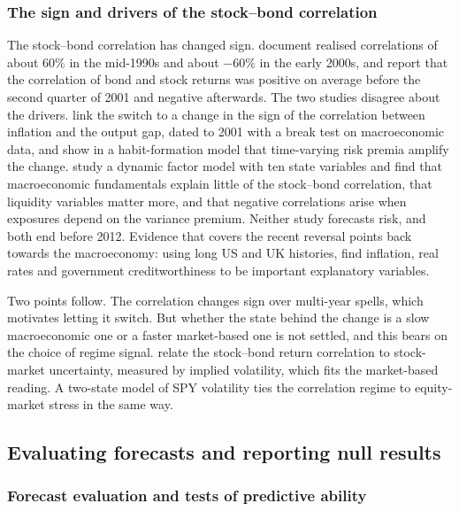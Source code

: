 \subsubsection{The sign and drivers of the stock--bond correlation}\label{sec:lit-drivers}

The stock--bond correlation has changed sign. \citet{baele2010} document realised correlations of about 60\% in the mid-1990s and about $-60\%$ in the early 2000s, and \citet{campbell2020} report that the correlation of bond and stock returns was positive on average before the second quarter of 2001 and negative afterwards. The two studies disagree about the drivers. \citet{campbell2020} link the switch to a change in the sign of the correlation between inflation and the output gap, dated to 2001 with a break test on macroeconomic data, and show in a habit-formation model that time-varying risk premia amplify the change. \citet{baele2010} study a dynamic factor model with ten state variables and find that macroeconomic fundamentals explain little of the stock--bond correlation, that liquidity variables matter more, and that negative correlations arise when exposures depend on the variance premium. Neither study forecasts risk, and both end before 2012. Evidence that covers the recent reversal points back towards the macroeconomy: using long US and UK histories, \citet{molenaar2024} find inflation, real rates and government creditworthiness to be important explanatory variables.

Two points follow. The correlation changes sign over multi-year spells, which motivates letting it switch. But whether the state behind the change is a slow macroeconomic one or a faster market-based one is not settled, and this bears on the choice of regime signal. \citet{connolly2005} relate the stock--bond return correlation to stock-market uncertainty, measured by implied volatility, which fits the market-based reading. A two-state model of SPY volatility ties the correlation regime to equity-market stress in the same way.

\subsection{Evaluating forecasts and reporting null results}

\subsubsection{Forecast evaluation and tests of predictive ability}\label{sec:lit-eval}

